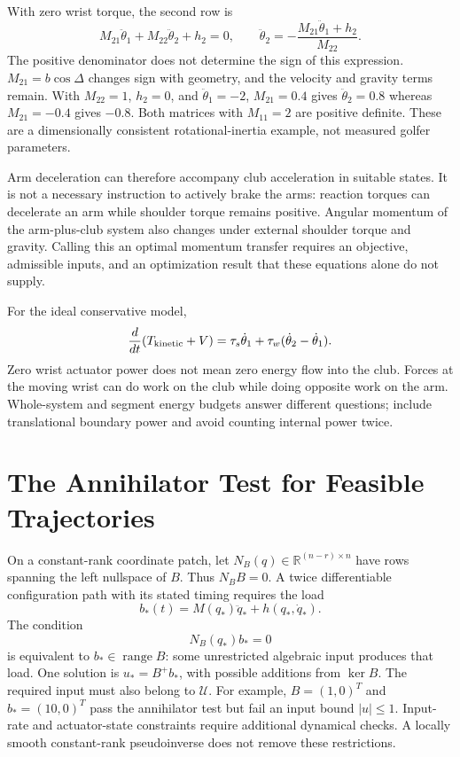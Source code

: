 \documentclass[12pt, openany]{book}
\theoremstyle{plain}
\begin{document}
With zero wrist torque, the second row is
\begin{equation}
M_{21}\ddot\theta_1+M_{22}\ddot\theta_2+h_2=0,
\qquad
\ddot\theta_2=-\frac{M_{21}\ddot\theta_1+h_2}{M_{22}}.
\label{eq:pend_unactuated}
\end{equation}
The positive denominator does not determine the sign of this expression.
$M_{21}=b\cos\Delta$ changes sign with geometry, and the velocity and gravity
terms remain. With $M_{22}=1$, $h_2=0$, and $\ddot\theta_1=-2$,
$M_{21}=0.4$ gives $\ddot\theta_2=0.8$ whereas $M_{21}=-0.4$ gives $-0.8$.
Both matrices with $M_{11}=2$ are positive definite. These are a dimensionally
consistent rotational-inertia example, not measured golfer parameters.

Arm deceleration can therefore accompany club acceleration in suitable states.
It is not a necessary instruction to actively brake the arms: reaction torques
can decelerate an arm while shoulder torque remains positive. Angular momentum
of the arm-plus-club system also changes under external shoulder torque and
gravity. Calling this an optimal momentum transfer requires an objective,
admissible inputs, and an optimization result that these equations alone do not supply.

For the ideal conservative model,
\begin{equation}
\frac{d}{dt}(T_{\rm kinetic}+V)
=\tau_s\dot\theta_1+\tau_w(\dot\theta_2-\dot\theta_1).
\end{equation}
Zero wrist actuator power does not mean zero energy flow into the club.
Forces at the moving wrist can do work on the club while doing opposite work
on the arm. Whole-system and segment energy budgets answer different questions;
include translational boundary power and avoid counting internal power twice.

\section{The Annihilator Test for Feasible Trajectories}

On a constant-rank coordinate patch, let $N_B(q)\in\mathbb R^{(n-r)\times n}$
have rows spanning the left nullspace of $B$. Thus $N_BB=0$. A twice
differentiable configuration path with its stated timing requires the load
\begin{equation}
b_*(t)=M(q_*)\ddot q_*+h(q_*,\dot q_*).
\end{equation}
The condition
\begin{equation}
N_B(q_*)b_*=0
\label{eq:unactuated_dynamics}
\end{equation}
is equivalent to $b_*\in\operatorname{range}B$: some unrestricted algebraic
input produces that load. One solution is $u_*=B^+b_*$, with possible additions
from $\ker B$. The required input must also belong to $\mathcal U$.
For example, $B=(1,0)^T$ and $b_*=(10,0)^T$ pass the annihilator test but fail
an input bound $|u|\leq1$. Input-rate and actuator-state constraints require
additional dynamical checks. A locally smooth constant-rank pseudoinverse does
not remove these restrictions.
\end{document}
